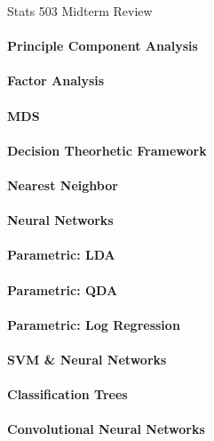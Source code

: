 \documentclass[12pt]{exam}
\begin{document}
\begin{center}

\huge{Stats 503 Midterm Review}

\end{center}


\paragraph{Principle Component Analysis}


\paragraph{Factor Analysis}

\paragraph{MDS}



\paragraph{Decision Theorhetic Framework}


\paragraph{Nearest Neighbor}


\paragraph{Neural Networks}



\paragraph{Parametric: LDA}


\paragraph{Parametric: QDA}



\paragraph{Parametric: Log Regression}


\paragraph{SVM \& Neural Networks}


\paragraph{Classification Trees}


\paragraph{Convolutional Neural Networks}
\end{document}
